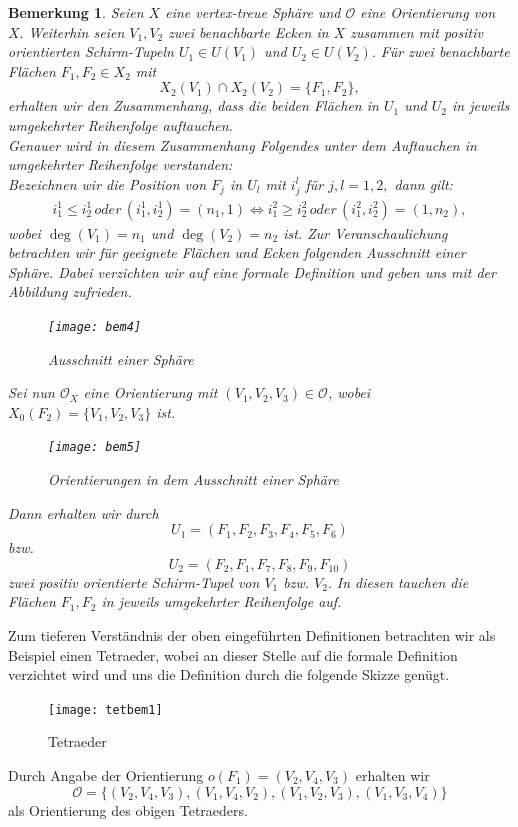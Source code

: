 \documentclass[12pt,titlepage,twoside,cleardoublepage]{article}
\theoremstyle{nummermitklammern}
\newtheorem{bemerkung}[temp]{Bemerkung}
\newtheorem{bemerkung}[zahl]{Bemerkung}
\numberwithin{equation}{section}
\begin{document}
\begin{bemerkung}\label{pos}
Seien $X$ eine vertex-treue Sphäre und $\mathcal{O}$ eine Orientierung von $X.$ Weiterhin seien $V_1,V_2$ zwei benachbarte Ecken in $X$ zusammen mit positiv orientierten Schirm-Tupeln $U_1\in U(V_1)$ und $U_2\in U(V_2).$ Für zwei benachbarte Flächen $F_1,F_2\in X_2$ mit 
\[
X_2(V_1)\cap X_2(V_2)=\{F_1,F_2\},
\]
erhalten wir den Zusammenhang, dass die beiden Flächen in $U_1$ und  $U_2$ in jeweils umgekehrter Reihenfolge auftauchen.\\
Genauer wird in diesem Zusammenhang Folgendes unter dem Auftauchen in umgekehrter Reihenfolge verstanden:\\ 
Bezeichnen wir die Position von $F_j$ in $U_l$ mit $i_j^l$ für $j,l=1,2,$ dann gilt:
\begin{align*}
i^1_1\leq i_2^1 \, oder \, (i_1^1,i^1_2)=(n_1,1)\Leftrightarrow i^2_1\geq i_2^2 \, oder \, (i_1^2,i^2_2)=(1,n_2),
\end{align*}
wobei $\deg(V_1)=n_1$ und $\deg(V_2)=n_2$ ist.
Zur Veranschaulichung betrachten wir für geeignete Flächen und Ecken folgenden Ausschnitt einer Sphäre. Dabei verzichten wir auf eine formale Definition und geben uns mit der Abbildung zufrieden. 
\begin{figure}[H]
\begin{center}
\texttt{[image: bem4]}
\end{center}
\caption{Ausschnitt einer Sphäre}
\end{figure}
Sei nun $\mathcal{O}_X$ eine Orientierung mit $(V_1,V_2,V_3)\in \mathcal{O}$, wobei $X_0(F_2)=\{V_1,V_2,V_3\}$ ist.
\begin{figure}[H]
\begin{center}
\texttt{[image: bem5]}
\end{center}
\caption{Orientierungen in dem Ausschnitt einer Sphäre}
\end{figure}

Dann erhalten wir durch 
\[
U_1=(F_1,F_2,F_3,F_4,F_5,F_6)
\]
bzw.
\[
U_2=(F_2,F_1,F_7,F_8,F_9,F_{10})
\]
zwei positiv orientierte Schirm-Tupel von $V_1$ bzw. $V_2.$ In diesen tauchen die Flächen $F_1,F_2$ in jeweils umgekehrter Reihenfolge auf. 
\end{bemerkung}
Zum tieferen Verständnis der oben eingeführten Definitionen betrachten wir als Beispiel einen Tetraeder, wobei an dieser Stelle auf die formale Definition verzichtet wird und uns die Definition durch die folgende Skizze genügt.
\begin{figure}[H]
\begin{center}
\texttt{[image: tetbem1]}
\end{center}
\caption{Tetraeder}
\end{figure} 
Durch Angabe der Orientierung $o(F_1)=(V_2,V_4,V_3)$ erhalten wir
\[
\mathcal{O}=\{(V_2,V_4,V_3),(V_1,V_4,V_2),(V_1,V_2,V_3),(V_1,V_3,V_4)\}
\] 
als Orientierung des obigen Tetraeders.
 
\end{document}
